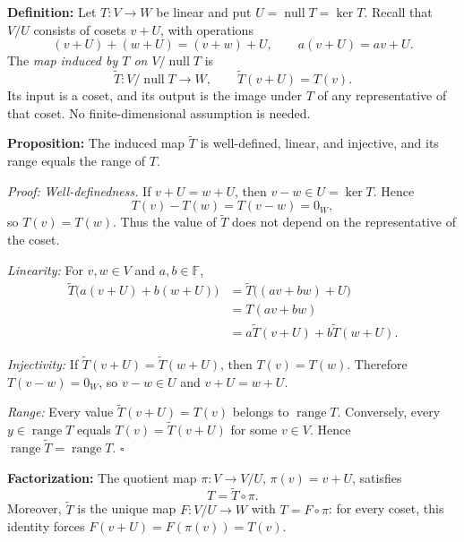 \documentclass[a4paper,11pt,abstract=true]{scrartcl}
\theoremstyle{dotlessP}
\theoremstyle{dotlessS}
\theoremstyle{remark}
\theoremstyle{definition}
\begin{document}
\begin{claim_box}
\textbf{Definition:} Let
$T:V\longrightarrow W$ be linear and put $U=\operatorname{null}T=\ker T$.
Recall that $V/U$ consists of cosets $v+U$, with operations
\[
(v+U)+(w+U)=(v+w)+U,\qquad a(v+U)=av+U.
\]
The \emph{map induced by $T$ on $V/\operatorname{null}T$} is
\[
\widetilde{T}:V/\operatorname{null}T\longrightarrow W,
\qquad \widetilde{T}(v+U)=T(v).
\]
Its input is a coset, and its output is the image under $T$ of any
representative of that coset. No finite-dimensional assumption is needed.
\end{claim_box}

\begin{problem_box}
\textbf{Proposition:} The induced map $\widetilde{T}$ is
well-defined, linear, and injective, and its range equals the range of $T$.

\end{problem_box}

\begin{claim_box}
\textit{Proof:} \emph{Well-definedness.} If $v+U=w+U$, then $v-w\in U=\ker T$.
Hence
\[
T(v)-T(w)=T(v-w)=0_W,
\]
so $T(v)=T(w)$. Thus the value of $\widetilde{T}$ does not depend on
the representative of the coset.

\emph{Linearity:} For $v,w\in V$ and $a,b\in\mathbb{F}$,
\[
\begin{aligned}
\widetilde{T}\bigl(a(v+U)+b(w+U)\bigr)
&=\widetilde{T}\bigl((av+bw)+U\bigr)\\
&=T(av+bw)\\
&=a\widetilde{T}(v+U)+b\widetilde{T}(w+U).
\end{aligned}
\]

\emph{Injectivity:} If $\widetilde{T}(v+U)=\widetilde{T}(w+U)$,
then $T(v)=T(w)$. Therefore $T(v-w)=0_W$, so $v-w\in U$ and
$v+U=w+U$.

\emph{Range:} Every value $\widetilde{T}(v+U)=T(v)$ belongs to
$\operatorname{range}T$. Conversely, every $y\in\operatorname{range}T$
equals $T(v)=\widetilde{T}(v+U)$ for some $v\in V$. Hence
$\operatorname{range}\widetilde{T}=\operatorname{range}T$.
\hfill$\square$
\end{claim_box}

\begin{claim_box}
\textbf{Factorization:} The quotient map
$\pi:V\longrightarrow V/U$, $\pi(v)=v+U$, satisfies
\[
T=\widetilde{T}\circ\pi.
\]
Moreover, $\widetilde{T}$ is the unique map $F:V/U\longrightarrow W$
with $T=F\circ\pi$: for every coset, this identity forces
$F(v+U)=F(\pi(v))=T(v)$.
\end{claim_box}
\end{document}
